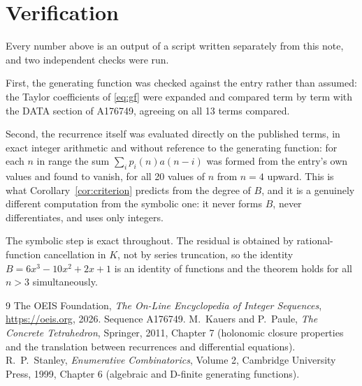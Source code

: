 \documentclass[11pt,a4paper]{article}
\theoremstyle{plain}
\theoremstyle{definition}
\begin{document}
\section{Verification}

Every number above is an output of a script written separately from this note, and two
independent checks were run.

First, the generating function was checked against the entry rather than assumed: the
Taylor coefficients of \eqref{eq:gf} were expanded and compared term by term with the DATA
section of A176749, agreeing on all 13 terms compared.

Second, the recurrence itself was evaluated directly on the published terms, in exact
integer arithmetic and without reference to the generating function: for each $n$ in range
the sum $\sum_{i}p_{i}(n)a(n-i)$ was formed from the entry's own values and found to
vanish, for all 20 values of $n$ from $n=4$ upward. This is what
Corollary~\ref{cor:criterion} predicts from the degree of $B$, and it is a genuinely
different computation from the symbolic one: it never forms $B$, never differentiates, and
uses only integers.

The symbolic step is exact throughout. The residual is obtained by rational-function
cancellation in $K$, not by series truncation, so the identity $B=6 x^{3} - 10 x^{2} + 2 x + 1$ is an
identity of functions and the theorem holds for all $n>3$ simultaneously.

\begin{thebibliography}{9}
 The OEIS Foundation, \emph{The On-Line Encyclopedia of Integer Sequences},
\url{https://oeis.org}, 2026. Sequence A176749.
 M.~Kauers and P.~Paule, \emph{The Concrete Tetrahedron}, Springer, 2011,
Chapter 7 (holonomic closure properties and the translation between recurrences and
differential equations).
 R.~P.~Stanley, \emph{Enumerative Combinatorics}, Volume 2, Cambridge
University Press, 1999, Chapter 6 (algebraic and D-finite generating functions).
\end{thebibliography}
\end{document}
